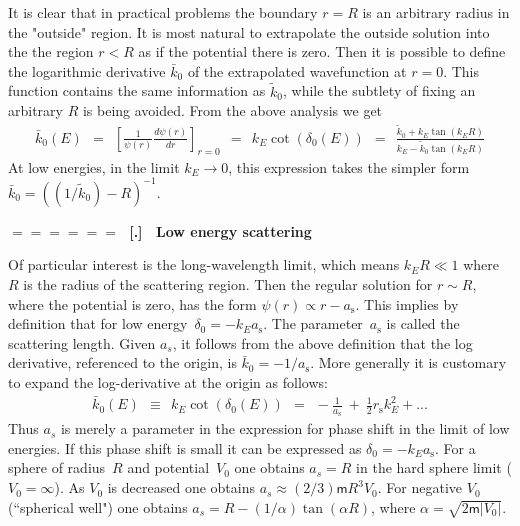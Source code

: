 \documentclass[onecolumn,fleqn]{revtex4}
\newcommand{\mass}{\mathsf{m}}
\newcommand{\tbox}[1]{\text{#1}}
\newcommand{\beq}{\begin{eqnarray}}
\newcommand{\eeq}{\end{eqnarray}}
\renewcommand{\thesubsection}{\arabic{subsection}}
\renewcommand{\thesubsubsection}{\arabic{subsubsection}}
\newcommand{\sheadC}[1]
{
\addtocounter{subsubsection}{1}
\vspace{5mm}
{\Large\bf $=\!=\!=\!=\!=\!=\;$ [\thesubsection.\thesubsubsection] \ #1}  
\nopagebreak
\phantomsection
}
\begin{document}
It is clear that in practical problems  
the boundary ${r=R}$ is an arbitrary radius 
in the "outside" region. It is most natural 
to extrapolate the outside solution into the 
the region ${r<R}$ as if the potential there is zero. 
Then it is possible to define the logarithmic 
derivative $\bar{k}_0$ of the extrapolated 
wavefunction at ${r=0}$. This function contains 
the same information as $\tilde{k}_0$, 
while the subtlety of fixing an arbitrary $R$ 
is being avoided.  From the above analysis we get
\beq
\bar{k}_0(E) 
\ \ = \ \ \left[\frac{1}{\psi(r)}\frac{d\psi(r)}{dr}\right]_{r=0}
\ \ = \ \ k_E\cot(\delta_0(E)) 
\ \ = \ \ \frac{\tilde{k}_{0}+k_E\tan(k_ER)}{k_E-\tilde{k}_{0}\tan(k_ER)}
\eeq 
At low energies, in the limit $k_E\rightarrow 0$, 
this expression takes the simpler form ${\bar{k}_0=((1/\tilde{k}_0)-R)^{-1}}$. 



\sheadC{Low energy scattering}

Of particular interest is the long-wavelength limit, 
which means ${k_ER \ll 1}$ where $R$ is the radius 
of the scattering region. Then the regular solution 
for ${r \sim R}$, where the potential is zero,   
has the form ${\psi(r)\propto r-a_{\tbox{s}}}$.
This implies by definition that for low energy~${\delta_0=-k_Ea_{\tbox{s}}}$.  
The parameter~$a_{\tbox{s}}$ is called the scattering length. 
Given $a_s$, it follows from the above definition 
that the log derivative, referenced to the origin, 
is ${\bar{k}_0=-1/a_{\tbox{s}}}$. 
More generally it is customary to expand  
the log-derivative at the origin as follows:  
\beq
\bar{k}_0(E) \ \ \equiv \ \ k_E\cot(\delta_0(E)) 
\ \ = \ \ -\frac{1}{a_{\tbox{s}}} \ + \ \frac{1}{2}r_{\tbox{s}} k_E^2 + ...
\eeq
Thus $a_s$ is merely a parameter in the expression 
for phase shift in the limit of low energies. 
If this phase shift is small it can be  
expressed as ${\delta_0=-k_Ea_{\tbox{s}}}$.
For a sphere of radius~$R$ and potential~$V_0$
one obtains ${a_s = R}$ in the hard sphere limit (${V_0=\infty}$).
As $V_0$ is decreased one obtains ${a_s \approx (2/3)\mass R^3 V_0 }$.
For negative $V_0$ (``spherical well") one obtains ${a_s=R-(1/\alpha)\tan(\alpha R)}$, 
where ${\alpha=\sqrt{2\mass |V_0|}}$. 
\end{document}
